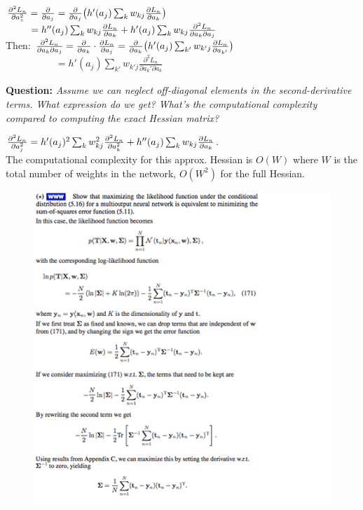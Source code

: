 \tab$\pdv[2]{L_n}{a_z} = \pdv{}{a_j} ( \pdv{L_n}{a_j} ) = \pdv{}{a_j} \bigr( h'(a_j) \sum_k w_{kj} \pdv{L_n}{a_k} \bigr) $\\
\tab$\phantom{\pdv[2]{L_n}{a_z} } = h''(a_j) \sum_k w_{kj} \pdv{L_n}{a_k}+h'(a_j) \sum_k w_{kj} \frac{\partial^2 L_n}{\partial a_k \partial a_j}$\\

Then: $\frac{\partial^2 L_n}{\partial a_k \partial a_j}= \pdv{}{a_k} \cdot \pdv{L_n}{a_j} = \pdv{}{a_k} \bigr(h'(a_j) \sum_{k'} w_{k'j} \pdv{L_n}{a_{k'}} \bigr)$\\

$\phantom{\text{Then: }\frac{\partial^2 L_n}{\partial a_k \partial a_j}}=h'(a_j)\sum_{k'} w_{k'j} \frac{\partial^2 L_n}{\partial a_k' \partial a_k}$

\textbf{Question:} \emph{Assume we can neglect off-diagonal elements in the second-derivative terms. What expression do we get? What's the computational complexity compared to computing the exact Hessian matrix?}

\tab$\pdv[2]{L_n}{a_j} = h'(a_j)^2 \sum_k w^2_{kj} \pdv[2]{L_n}{a_k} + h''(a_j) \sum_k w_{kj} \pdv{L_n}{a_k}$.\\

\tab The computational complexity for this approx. Hessian is $O(W)$ where $W$ is the total number of weights in the network, $O(W^2)$ for the full Hessian.

\begin{figure}[H]
        \includegraphics[width=\columnwidth]{images/bishop5-3.png}
        
        \label{fig:my_labeflf}
    \end{figure}

